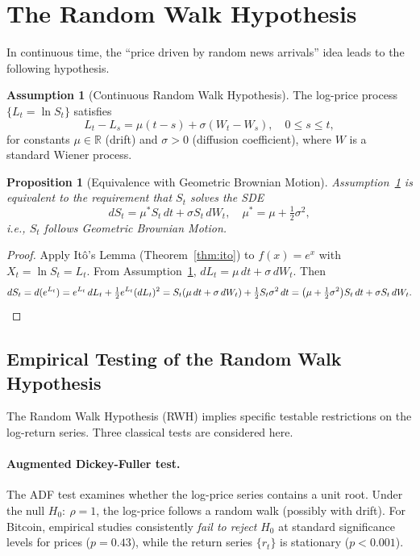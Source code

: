 \documentclass[12pt, a4paper, oneside]{report}
\theoremstyle{plain}
\newtheorem{proposition}[theorem]{Proposition}
\theoremstyle{definition}
\newtheorem{assumption}[theorem]{Assumption}
\theoremstyle{remark}
\newcommand{\R}{\mathbb{R}}
\begin{document}
\section{The Random Walk Hypothesis}

In continuous time, the ``price driven by random news arrivals'' idea leads to
the following hypothesis.

\begin{assumption}[Continuous Random Walk Hypothesis]
\label{ass:crw}
The log-price process $\{L_t = \ln S_t\}$ satisfies
\[
  L_t - L_s = \mu(t - s) + \sigma(W_t - W_s), \quad 0 \leq s \leq t,
\]
for constants $\mu \in \R$ (drift) and $\sigma > 0$ (diffusion coefficient),
where $W$ is a standard Wiener process.
\end{assumption}

\begin{proposition}[Equivalence with Geometric Brownian Motion]
\label{prop:gbm_equiv}
Assumption~\ref{ass:crw} is equivalent to the requirement that $S_t$ solves
the SDE
\[
  dS_t = \mu^* S_t\,dt + \sigma S_t\,dW_t, \quad \mu^* = \mu + \tfrac{1}{2}\sigma^2,
\]
i.e., $S_t$ follows Geometric Brownian Motion.
\end{proposition}

\begin{proof}
Apply It\^{o}'s Lemma (Theorem~\ref{thm:ito}) to $f(x) = e^x$ with
$X_t = \ln S_t = L_t$.  From Assumption~\ref{ass:crw},
$dL_t = \mu\,dt + \sigma\,dW_t$.  Then
\[
  dS_t = d(e^{L_t})
  = e^{L_t}\,dL_t + \tfrac{1}{2} e^{L_t} (dL_t)^2
  = S_t(\mu\,dt + \sigma\,dW_t) + \tfrac{1}{2} S_t \sigma^2\,dt
  = \bigl(\mu + \tfrac{1}{2}\sigma^2\bigr)S_t\,dt + \sigma S_t\,dW_t. \qedhere
\]
\end{proof}

\subsection{Empirical Testing of the Random Walk Hypothesis}

The Random Walk Hypothesis (RWH) implies specific testable restrictions on
the log-return series.  Three classical tests are considered here.

\paragraph{Augmented Dickey-Fuller test.}
The ADF test examines whether the log-price series contains a unit root.
Under the null $H_0{:}\ \rho = 1$, the log-price follows a random walk (possibly
with drift).  For Bitcoin, empirical studies consistently \emph{fail to reject}
$H_0$ at standard significance levels for prices ($p = 0.43$),
while the return series $\{r_t\}$ is stationary ($p < 0.001$).
\end{document}
